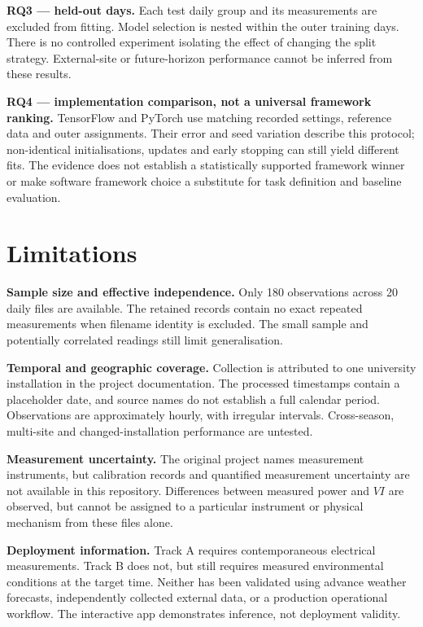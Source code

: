 \documentclass[10pt,journal,twoside]{IEEEtran}
\begin{document}
\textbf{RQ3 --- held-out days.} Each test daily group and its measurements are excluded from fitting. Model selection is nested within the outer training days. There is no controlled experiment isolating the effect of changing the split strategy. External-site or future-horizon performance cannot be inferred from these results.

\textbf{RQ4 --- implementation comparison, not a universal framework ranking.} TensorFlow and PyTorch use
matching recorded settings, reference data and outer assignments. Their error and seed variation
describe this protocol; non-identical initialisations, updates and early stopping can still yield
different fits. The evidence does not establish a statistically supported framework winner or make
software framework choice a substitute for task definition and baseline evaluation.

\section{Limitations}


\textbf{Sample size and effective independence.} Only 180 observations across 20 daily files are available. The retained records contain no exact repeated measurements when filename identity is excluded. The small sample and potentially correlated readings still limit generalisation.

\textbf{Temporal and geographic coverage.} Collection is attributed to one university installation
in the project documentation. The processed timestamps contain a placeholder date, and source
names do not establish a full calendar period. Observations are approximately hourly, with
irregular intervals. Cross-season, multi-site and changed-installation performance are untested.

\textbf{Measurement uncertainty.} The original project names measurement instruments, but calibration
records and quantified measurement uncertainty are not available in this repository. Differences
between measured power and $VI$ are observed, but cannot be assigned to a particular instrument
or physical mechanism from these files alone.

\textbf{Deployment information.} Track A requires contemporaneous electrical measurements. Track B
does not, but still requires measured environmental conditions at the target time. Neither has
been validated using advance weather forecasts, independently collected external data, or a
production operational workflow. The interactive app demonstrates inference, not deployment validity.
\end{document}
